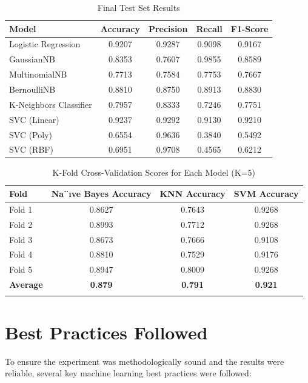 \documentclass[12pt]{article}
\begin{document}
\begin{table}[H]
\centering
\caption{Final Test Set Results}
\label{tab:test_comparison}
\small
\begin{tabular}{@{}lcccc@{}}
\toprule
\textbf{Model} & \textbf{Accuracy} & \textbf{Precision} & \textbf{Recall} & \textbf{F1-Score} \\
\midrule
Logistic Regression & 0.9207 & 0.9287 & 0.9098 & 0.9167 \\
GaussianNB & 0.8353 & 0.7607 & 0.9855 & 0.8589 \\
MultinomialNB & 0.7713 & 0.7584 & 0.7753 & 0.7667 \\
BernoulliNB & 0.8810 & 0.8750 & 0.8913 & 0.8830 \\
K-Neighbors Classifier & 0.7957 & 0.8333 & 0.7246 & 0.7751 \\
SVC (Linear) & 0.9237 & 0.9292 & 0.9130 & 0.9210 \\
SVC (Poly) & 0.6554 & 0.9636 & 0.3840 & 0.5492 \\
SVC (RBF) & 0.6951 & 0.9708 & 0.4565 & 0.6212 \\

\bottomrule
\end{tabular}
\end{table}

\begin{table}[H]
\centering
\caption{K-Fold Cross-Validation Scores for Each Model (K=5)}
\label{tab:kfold_cv}
\begin{tabular}{@{}lccc@{}}
\toprule
\textbf{Fold} & \textbf{Na¨ıve Bayes Accuracy} & \textbf{KNN Accuracy} & \textbf{SVM Accuracy} \\
\midrule
Fold 1 & 0.8627 & 0.7643 & 0.9268 \\
Fold 2 & 0.8993 & 0.7712 & 0.9268 \\
Fold 3 & 0.8673 & 0.7666 & 0.9108 \\
Fold 4 & 0.8810 & 0.7529 & 0.9176 \\
Fold 5 & 0.8947 & 0.8009 & 0.9268 \\
\midrule
\textbf{Average} & \textbf{0.879} & \textbf{0.791} & \textbf{0.921} \\
\bottomrule
\multicolumn{4}{l}{}
\end{tabular}
\end{table}

\section{Best Practices Followed}
To ensure the experiment was methodologically sound and the results were reliable, several key machine learning best practices were followed:
\end{document}
